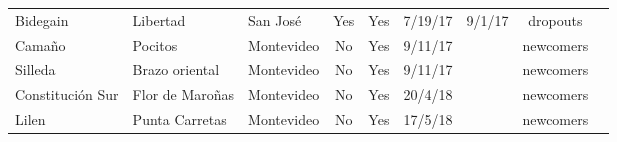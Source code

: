 \documentclass[11pt]{article}
\begin{document}
\begin{small}
\begin{table}[htbp!]
\begin{tabular}{@{}lllcccccc@{}}
 Bidegain	 	&	 	Libertad	 	&	 	San José	 	&	 	Yes	 	&	 	Yes	 	&	 	7/19/17	 	&	 	9/1/17	 	&	 	dropouts	\\
 Camaño	 	&	 	Pocitos	 	&	 	Montevideo	 	&	 	No	 	&	 	Yes	 	&	 	9/11/17	 	&	 		 	&	 	newcomers	\\
 Silleda	 	&	 	Brazo oriental	 	&	 	Montevideo	 	&	 	No	 	&	 	Yes	 	&	 	9/11/17	 	&	 		 	&	 	newcomers\\
 Constitución Sur	 	&	 	Flor de Maroñas	 	&	 	Montevideo	 	&	 	No	 	&	 	Yes	 	&	 	20/4/18	 	&	 		 	&	 	newcomers	\\
 Lilen	 	&	 	Punta Carretas	 	&	 	Montevideo	 	&	 	No	 	&	 	Yes	 	&	 	17/5/18	 	&	 		 	&	 	newcomers	\\
\bottomrule
\end{tabular}
\end{table}
\end{small}
\end{document}
